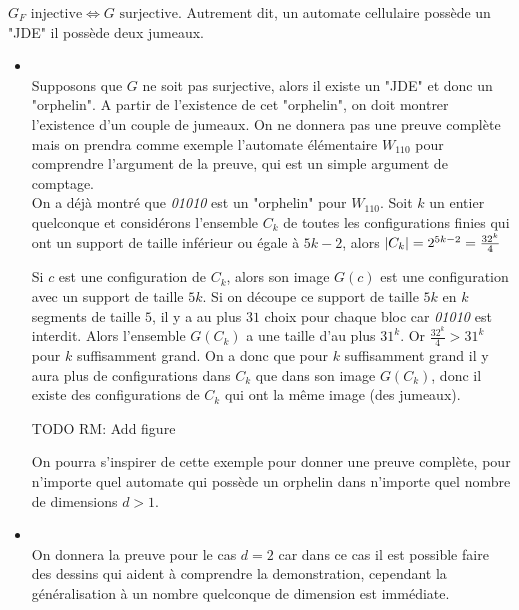 \begin{theorem}
	$G_F \text{ injective} \iff G \text{ surjective}$. Autrement dit, un automate cellulaire possède un "JDE" \ssi il possède deux jumeaux.
\end{theorem}



\begin{proofI}
	\begin{itemize}
		\item \bimpLR\\
		      Supposons que $G$ ne soit pas surjective, alors il existe un "JDE" et donc un "orphelin".
		      A partir de l'existence de cet "orphelin", on doit montrer l'existence d'un couple de jumeaux.
		      On ne donnera pas une preuve complète mais on prendra comme exemple l'automate élémentaire $W_{110}$ pour
		      comprendre l'argument de la preuve, qui est un simple argument de comptage.\\
		      On a déjà montré que \emph{01010} est un "orphelin" pour $W_{110}$. Soit $k$ un entier quelconque
		      et considérons  l'ensemble $C_k$ de toutes les configurations finies qui ont un support de taille
		      inférieur ou égale à $5k-2$, alors $\left|C_k\right| = 2^{5k-2} = \frac {32^k} 4$

		      Si $c$ est une configuration de $C_k$, alors son image $G(c)$ est une configuration avec un support de taille $5k$.
		      Si on découpe ce support de taille $5k$ en $k$ segments de taille $5$, il y a au plus $31$ choix pour chaque bloc car
		      \emph{01010} est interdit. Alors l'ensemble $G(C_k)$ a une taille d'au plus $31^k$.
		      Or $\frac {32^k} 4 > 31 ^ k$ pour  $k$ suffisamment grand. On a donc que pour $k$ suffisamment grand
		      il y aura plus de configurations
		      dans $C_k$ que dans son image $G(C_k)$, donc il existe des configurations de
		      $C_k$ qui ont la même image (des jumeaux).

		      TODO RM: Add figure

		      On pourra s'inspirer de cette exemple pour donner une preuve complète, pour n'importe quel automate qui possède un
		      orphelin dans n'importe
		      quel nombre de dimensions $d > 1$.


		\item \bimpRL\\
		      On donnera la preuve pour le cas $d=2$ car dans ce cas il est possible faire des dessins qui aident à
		      comprendre la demonstration, cependant la généralisation à un nombre quelconque de dimension est immédiate.


\end{itemize}
\end{proofI}
